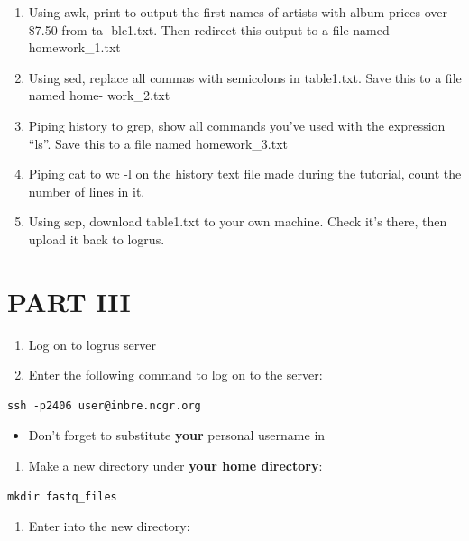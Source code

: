 \documentclass[
]{book}
\providecommand{\tightlist}{%
  \setlength{\itemsep}{0pt}\setlength{\parskip}{0pt}}
\begin{document}
\begin{enumerate}
\def\labelenumi{\arabic{enumi}.}
\item
  Using awk, print to output the first names of artists with album prices over \$7.50 from ta- ble1.txt. Then redirect this output to a file named homework\_1.txt
\item
  Using sed, replace all commas with semicolons in table1.txt. Save this to a file named home- work\_2.txt
\item
  Piping history to grep, show all commands you've used with the expression ``ls''. Save this to a file named homework\_3.txt
\item
  Piping cat to wc -l on the history text file made during the tutorial, count the number of lines in it.
\item
  Using scp, download table1.txt to your own machine. Check it's there, then upload it back to logrus.
\end{enumerate}

\hypertarget{part-iii}{%
\section{PART III}\label{part-iii}}

\begin{enumerate}
\def\labelenumi{\arabic{enumi})}
\item
  Log on to logrus server
\item
  Enter the following command to log on to the server:
\end{enumerate}

\begin{verbatim}
ssh -p2406 user@inbre.ncgr.org
\end{verbatim}

\begin{itemize}
\tightlist
\item
  Don't forget to substitute \textbf{your} personal username in
\end{itemize}

\begin{enumerate}
\def\labelenumi{\arabic{enumi})}
\setcounter{enumi}{2}
\tightlist
\item
  Make a new directory under \textbf{your home directory}:
\end{enumerate}

\begin{verbatim}
mkdir fastq_files
\end{verbatim}

\begin{enumerate}
\def\labelenumi{\arabic{enumi})}
\setcounter{enumi}{3}
\tightlist
\item
  Enter into the new directory:
\end{enumerate}
\end{document}

